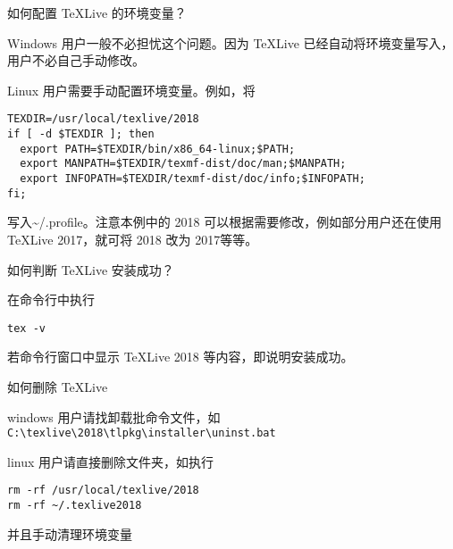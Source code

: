 \begin{faq}{如何配置 TeXLive 的环境变量？}

Windows 用户一般不必担忧这个问题。因为 TeXLive
已经自动将环境变量写入，用户不必自己手动修改。

Linux 用户需要手动配置环境变量。例如，将

\begin{verbatim}
TEXDIR=/usr/local/texlive/2018
if [ -d $TEXDIR ]; then
  export PATH=$TEXDIR/bin/x86_64-linux;$PATH;
  export MANPATH=$TEXDIR/texmf-dist/doc/man;$MANPATH;
  export INFOPATH=$TEXDIR/texmf-dist/doc/info;$INFOPATH;
fi;
\end{verbatim}

写入\textasciitilde{}/.profile。注意本例中的 2018
可以根据需要修改，例如部分用户还在使用 TeXLive 2017，就可将 2018 改为
2017等等。
\end{faq}


\begin{faq}{如何判断 TeXLive 安装成功？}

在命令行中执行

\begin{verbatim}
tex -v
\end{verbatim}

若命令行窗口中显示 TeXLive 2018 等内容，即说明安装成功。
\end{faq}


\begin{faq}{如何删除 TeXLive}

windows 用户请找卸载批命令文件，如
\verb|C:\texlive\2018\tlpkg\installer\uninst.bat|

linux 用户请直接删除文件夹，如执行

\begin{verbatim}
rm -rf /usr/local/texlive/2018
rm -rf ~/.texlive2018
\end{verbatim}

并且手动清理环境变量
\end{faq}


